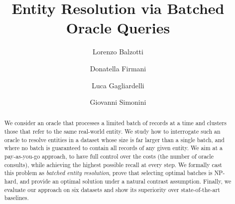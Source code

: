\documentclass[sigconf, nonacm]{acmart}
\newcommand{\red}[1]{\textcolor{red}{#1}}
\begin{document}
\title{Entity Resolution via Batched Oracle Queries}

\author{Lorenzo Balzotti}

\author{Donatella Firmani}

\author{Luca Gagliardelli}

\author{Giovanni Simonini}


\begin{abstract}
We consider an oracle that processes a limited batch of records at a time and clusters those that refer to the same real-world entity.
We study how to interrogate such an oracle to resolve entities in a dataset whose size is far larger than a single batch, and where no batch is guaranteed to contain all records of any given entity. %
We aim at a pay-as-you-go approach, to have full control over the costs (the number of oracle consults), while achieving the highest possible recall at every step.
We formally cast this problem as \textit{batched entity resolution}, prove that selecting optimal batches is NP-hard, and provide an optimal solution under a natural contrast assumption. 
Finally, we evaluate our approach on six datasets and show its superiority over state-of-the-art baselines.
\end{abstract}

\maketitle
\end{document}
